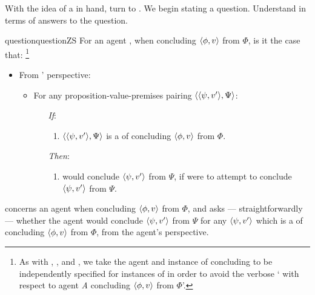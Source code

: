 \begin{note}
  With the idea of a \requ{} in hand, turn to \zSN{}.
  We begin stating a question.
  Understand \zSN{} in terms of answers to the question.

  \begin{restatable}[\qzS{}]{question}{questionZS}
    \label{question:zs}
    For an agent \vAgent{}, when concluding \(\langle \phi, v \rangle\) from \(\Phi\), is it the case that:%
    \footnote{
      As with \qWhy{}, \qHow{}, and \qWhyV{}, we take the agent and instance of concluding to be independently specified for instances of \qzS{} in order to avoid the verbose `\qzS{} with respect to agent \emph{A} concluding \(\langle \phi, v \rangle\) from \(\Phi\)'.
    }

    \begin{itemize}
    \item
      From \vAgent{}' perspective:
      \begin{itemize}
      \item
        For any proposition-value-premises pairing \(\langle \langle \psi, v' \rangle, \Psi \rangle\):
        \begin{itemize}
        \item[\emph{If}:]
          \begin{enumerate}[label=\alph*., ref=(\alph*)]
          \item
            \label{question:zs:option}
            \(\langle \langle \psi, v' \rangle, \Psi \rangle\) is a \requ{} of concluding \(\langle \phi, v \rangle\) from \(\Phi\).
          \end{enumerate}
        \item[\emph{Then}:]
          \begin{enumerate}[label=\alph*., ref=(\alph*), resume]
          \item
            \label{question:zs:may-fail}
            \vAgent{} would conclude \(\langle \psi, v' \rangle\) from \(\Psi\), if \vAgent{} were to attempt to conclude \(\langle \psi, v' \rangle\) from \(\Psi\).
          \end{enumerate}
        \end{itemize}
      \end{itemize}
    \end{itemize}
    \vspace{-\baselineskip}
  \end{restatable}

  \qzS{} concerns an agent when concluding \(\langle \phi, v \rangle\) from \(\Phi\), and asks --- straightforwardly --- whether the agent would conclude \(\langle \psi, v' \rangle\) from \(\Psi\) for any \(\langle \psi, v' \rangle\) which is a \requ{} of concluding \(\langle \phi, v \rangle\) from \(\Phi\), from the agent's perspective.
\end{note}

